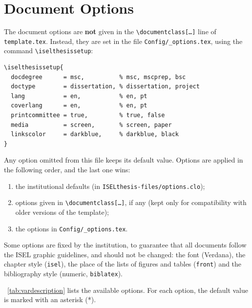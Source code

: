 \section{Document Options} %
\label{sec:document_options}

The document options are \textbf{not} given in the \texttt{\textbackslash documentclass[\ldots]} line of \texttt{template.tex}. Instead, they are set in the file \texttt{Config/\_options.tex}, using the command \texttt{\textbackslash iselthesissetup}:

\begin{Verbatim}[breaklines=true, breakanywhere=true]
\iselthesissetup{
  docdegree      = msc,          % msc, mscprep, bsc
  doctype        = dissertation, % dissertation, project
  lang           = en,           % en, pt
  coverlang      = en,           % en, pt
  printcommittee = true,         % true, false
  media          = screen,       % screen, paper
  linkscolor     = darkblue,     % darkblue, black
}
\end{Verbatim}

Any option omitted from this file keeps its default value. Options are applied in the following order, and the last one wins:
\begin{enumerate}
	\item the institutional defaults (in \texttt{ISELthesis-files/options.clo});
	\item options given in \texttt{\textbackslash documentclass[\ldots]}, if any (kept only for compatibility with older versions of the template);
	\item the options in \texttt{Config/\_options.tex}.
\end{enumerate}

Some options are fixed by the institution, to guarantee that all documents follow the ISEL graphic guidelines, and should not be changed: the font (Verdana), the chapter style (\texttt{isel}), the place of the lists of figures and tables (\texttt{front}) and the bibliography style (numeric, \texttt{biblatex}).

\tablename~\ref{tab:vardescription} lists the available options. For each option, the default value is marked with an asterisk (*).

